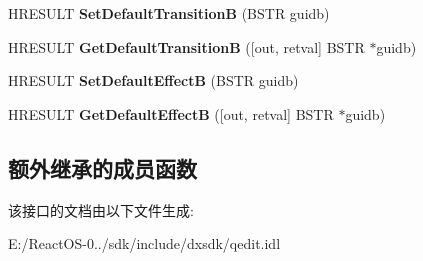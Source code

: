\begin{DoxyCompactItemize}
H\+R\+E\+S\+U\+LT {\bfseries Set\+Default\+TransitionB} (B\+S\+TR guidb)
\item 
\mbox{\label{interface_i_a_m_timeline_a1f833837aba793eb8d0aeaa55aadf260}} 
H\+R\+E\+S\+U\+LT {\bfseries Get\+Default\+TransitionB} (\mbox{[}out, retval\mbox{]} B\+S\+TR $\ast$guidb)
\item 
\mbox{\label{interface_i_a_m_timeline_ad40e69e02c9cafe8806942e760434f1f}} 
H\+R\+E\+S\+U\+LT {\bfseries Set\+Default\+EffectB} (B\+S\+TR guidb)
\item 
\mbox{\label{interface_i_a_m_timeline_a16e199d6ed32f94b5a21c9fb6944d094}} 
H\+R\+E\+S\+U\+LT {\bfseries Get\+Default\+EffectB} (\mbox{[}out, retval\mbox{]} B\+S\+TR $\ast$guidb)
\end{DoxyCompactItemize}
\subsection*{额外继承的成员函数}


该接口的文档由以下文件生成\+:\begin{DoxyCompactItemize}
\item 
E\+:/\+React\+O\+S-\/0../sdk/include/dxsdk/qedit.\+idl\end{DoxyCompactItemize}
